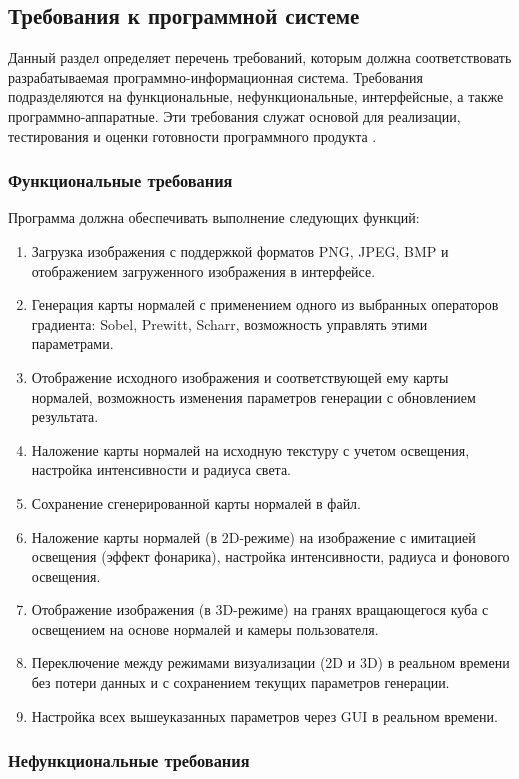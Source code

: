 \subsection{Требования к программной системе}

Данный раздел определяет перечень требований, которым должна соответствовать разрабатываемая программно-информационная система. Требования подразделяются на функциональные, нефункциональные, интерфейсные, а также программно-аппаратные. Эти требования служат основой для реализации, тестирования и оценки готовности программного продукта \cite{johnson2020}.
\subsubsection{Функциональные требования}

Программа должна обеспечивать выполнение следующих функций:
\begin{enumerate}
	\item Загрузка изображения с поддержкой форматов PNG, JPEG, BMP и отображением загруженного изображения в интерфейсе.
	\item Генерация карты нормалей с применением одного из выбранных операторов градиента: Sobel, Prewitt, Scharr, возможность управлять этими параметрами.
	\item Отображение исходного изображения и соответствующей ему карты нормалей, возможность изменения параметров генерации с обновлением результата.
	\item Наложение карты нормалей на исходную текстуру с учетом освещения, настройка интенсивности и радиуса света.
	\item Сохранение сгенерированной карты нормалей в файл.
	\item Наложение карты нормалей (в 2D-режиме) на изображение с имитацией освещения (эффект фонарика), настройка интенсивности, радиуса и фонового освещения.
	\item Отображение изображения (в 3D-режиме) на гранях вращающегося куба с освещением на основе нормалей и камеры пользователя.
	\item Переключение между режимами визуализации (2D и 3D) в реальном времени без потери данных и с сохранением текущих параметров генерации.
	\item Настройка всех вышеуказанных параметров через GUI в реальном времени.
\end{enumerate}
\subsubsection{Нефункциональные требования}

